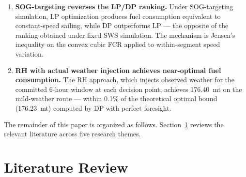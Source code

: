 \documentclass[review]{elsarticle}
\begin{document}
\begin{enumerate}
    \item \textbf{SOG-targeting reverses the LP/DP ranking.} Under SOG-targeting simulation, LP optimization produces fuel consumption equivalent to constant-speed sailing, while DP outperforms LP --- the opposite of the ranking obtained under fixed-SWS simulation. The mechanism is Jensen's inequality on the convex cubic FCR applied to within-segment speed variation.

    \item \textbf{RH with actual weather injection achieves near-optimal fuel consumption.} The RH approach, which injects observed weather for the committed 6-hour window at each decision point, achieves 176.40~mt on the mild-weather route --- within 0.1\% of the theoretical optimal bound (176.23~mt) computed by DP with perfect foresight.

\end{enumerate}

The remainder of this paper is organized as follows. Section~\ref{sec:literature} reviews the relevant literature across five research themes.


\section{Literature Review}
\label{sec:literature}
\end{document}
